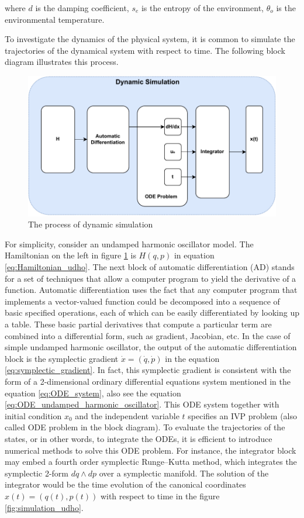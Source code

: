 \documentclass[
	parskip, 			   %
	twoside, 			   %
	DIV=14, 			   %
	BCOR=15.0mm, 		   %
	headsepline, 		   %
	open=right, 		   %
	captions=tableheading, %
	bibliography=totoc,    %
	numbers=noenddot       %
]{scrreprt}
\begin{document}
where $d$ is the damping coefficient, $s_{e}$ is the entropy of the environment, $\theta_{o}$ is the environmental temperature.

To investigate the dynamics of the physical system, it is common to simulate the trajectories of the dynamical system with respect to time. The following block diagram illustrates this process.

\begin{figure}[h!]
    \centering
    \includegraphics[scale=1]{figures/dynamic simulation.pdf}
    \caption{The process of dynamic simulation}
    \label{fig:simulation}
\end{figure}

For simplicity, consider an undamped harmonic oscillator model. The Hamiltonian on the left in figure \ref{fig:simulation} is $H(q,p)$ in equation \ref{eq:Hamiltonian_udho}. The next block of automatic differentiation (AD) stands for a set of techniques that allow a computer program to yield the derivative of a function. Automatic differentiation uses the fact that any computer program that implements a vector-valued function could be decomposed into a sequence of basic specified operations, each of which can be easily differentiated by looking up a table. These basic partial derivatives that compute a particular term are combined into a differential form, such as gradient, Jacobian, etc. In the case of simple undamped harmonic oscillator, the output of the automatic differentiation block is the symplectic gradient $\dot{x}=(\dot{q},\dot{p})$ in the equation \ref{eq:symplectic_gradient}. In fact, this symplectic gradient is consistent with the form of a 2-dimensional ordinary differential equations system mentioned in the equation \ref{eq:ODE_system}, also see the equation \ref{eq:ODE_undamped_harmonic_oscillator}. This ODE system together with initial condition $x_{0}$ and the independent variable $t$ specifies an IVP problem (also called ODE problem in the block diagram). To evaluate the trajectories of the states, or in other words, to integrate the ODEs, it is efficient to introduce numerical methods to solve this ODE problem. For instance, the integrator block may embed a fourth order symplectic Runge–Kutta method, which integrates the symplectic 2-form $dq \wedge dp$ over a symplectic manifold. The solution of the integrator would be the time evolution of the canonical coordinates $x(t)=\left( q(t), p(t) \right)$ with respect to time in the figure \ref{fig:simulation_udho}.
\end{document}
